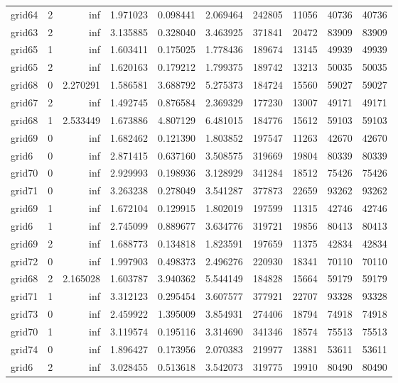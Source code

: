 \begin{longtable}{|l|r|r|r|r|r|r|r|r|r|}
grid64 & 2 & inf & 1.971023 & 0.098441 & 2.069464 & 242805 & 11056 & 40736 & 40736 \\
grid63 & 2 & inf & 3.135885 & 0.328040 & 3.463925 & 371841 & 20472 & 83909 & 83909 \\
grid65 & 1 & inf & 1.603411 & 0.175025 & 1.778436 & 189674 & 13145 & 49939 & 49939 \\
grid65 & 2 & inf & 1.620163 & 0.179212 & 1.799375 & 189742 & 13213 & 50035 & 50035 \\
grid68 & 0 & 2.270291 & 1.586581 & 3.688792 & 5.275373 & 184724 & 15560 & 59027 & 59027 \\
grid67 & 2 & inf & 1.492745 & 0.876584 & 2.369329 & 177230 & 13007 & 49171 & 49171 \\
grid68 & 1 & 2.533449 & 1.673886 & 4.807129 & 6.481015 & 184776 & 15612 & 59103 & 59103 \\
grid69 & 0 & inf & 1.682462 & 0.121390 & 1.803852 & 197547 & 11263 & 42670 & 42670 \\
grid6 & 0 & inf & 2.871415 & 0.637160 & 3.508575 & 319669 & 19804 & 80339 & 80339 \\
grid70 & 0 & inf & 2.929993 & 0.198936 & 3.128929 & 341284 & 18512 & 75426 & 75426 \\
grid71 & 0 & inf & 3.263238 & 0.278049 & 3.541287 & 377873 & 22659 & 93262 & 93262 \\
grid69 & 1 & inf & 1.672104 & 0.129915 & 1.802019 & 197599 & 11315 & 42746 & 42746 \\
grid6 & 1 & inf & 2.745099 & 0.889677 & 3.634776 & 319721 & 19856 & 80413 & 80413 \\
grid69 & 2 & inf & 1.688773 & 0.134818 & 1.823591 & 197659 & 11375 & 42834 & 42834 \\
grid72 & 0 & inf & 1.997903 & 0.498373 & 2.496276 & 220930 & 18341 & 70110 & 70110 \\
grid68 & 2 & 2.165028 & 1.603787 & 3.940362 & 5.544149 & 184828 & 15664 & 59179 & 59179 \\
grid71 & 1 & inf & 3.312123 & 0.295454 & 3.607577 & 377921 & 22707 & 93328 & 93328 \\
grid73 & 0 & inf & 2.459922 & 1.395009 & 3.854931 & 274406 & 18794 & 74918 & 74918 \\
grid70 & 1 & inf & 3.119574 & 0.195116 & 3.314690 & 341346 & 18574 & 75513 & 75513 \\
grid74 & 0 & inf & 1.896427 & 0.173956 & 2.070383 & 219977 & 13881 & 53611 & 53611 \\
grid6 & 2 & inf & 3.028455 & 0.513618 & 3.542073 & 319775 & 19910 & 80490 & 80490 \\

\end{longtable}
